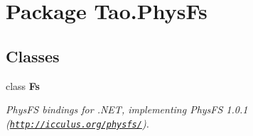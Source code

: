 \hypertarget{namespace_tao_1_1_phys_fs}{
\section{Package Tao.PhysFs}
\label{namespace_tao_1_1_phys_fs}
}
\subsection*{Classes}
\begin{DoxyCompactItemize}
\item 
class {\bfseries Fs}
\begin{DoxyCompactList}\small\item\em PhysFS bindings for .NET, implementing PhysFS 1.0.1 (\href{http://icculus.org/physfs/}{\tt http://icculus.org/physfs/}). \item\end{DoxyCompactList}\end{DoxyCompactItemize}
